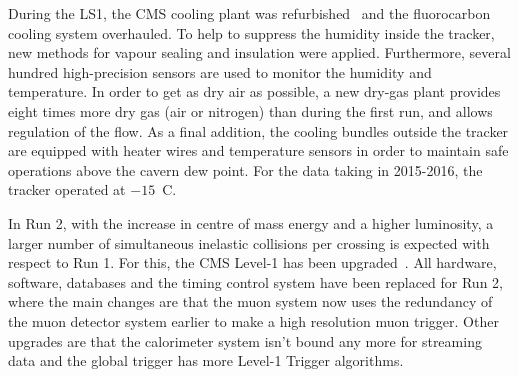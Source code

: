 During the LS1, the CMS cooling plant was refurbished~\cite{running:1998606} and the fluorocarbon cooling system overhauled. To help to suppress the humidity inside the tracker, new methods for vapour sealing and insulation were applied. Furthermore, several hundred high-precision sensors are used to monitor the humidity and temperature. In order to get as dry air as possible, a new dry-gas plant provides eight times more dry gas (air or nitrogen) than during the first run, and allows regulation of the flow. As a final addition, the cooling bundles outside the tracker are equipped with heater wires and temperature sensors in order to maintain safe operations above the cavern dew point. For the data taking in 2015-2016, the tracker operated at $-15$~\degree C.

%		
%	
In Run 2, with the increase in centre of mass energy and a higher luminosity, a larger number of simultaneous inelastic collisions per crossing is expected with respect to Run 1. For this, the CMS Level-1 has been upgraded~\cite{1748-0221-12-03-C03021}. All hardware, software, databases and the timing control system have been replaced for Run 2, where the main changes are that the muon system now uses the redundancy of the muon detector system earlier to make a high resolution muon trigger. Other upgrades are that the calorimeter system isn't bound any more for streaming data  and the global trigger has more Level-1 Trigger algorithms. 



